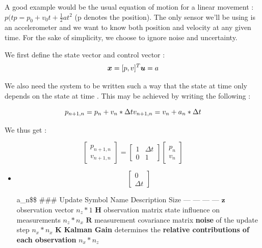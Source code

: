 \documentclass[12pt]{article}
\begin{document}
A good example would be the usual equation of motion for a linear
movement : \(p(tp = p_0 + v_0t + \frac{1}{2}at^2\) (p denotes the
position). The only sensor we'll be using is an accelerometer and we
want to know both position and velocity at any given time. For the sake
of simplicity, we choose to ignore noise and uncertainty.

We first define the state vector and control vector :
\[\boldsymbol x = [p, v]^T
\\
\boldsymbol u = a\]

We also need the system to be written such a way that the state at time
only depends on the state at time . This may be achieved by writing the
following :

\[p_{n+1,n} = p_{n} + v_{n}*\Delta t
\\
v_{n+1,n} = v_{n} + a_{n}*\Delta t\]

We thus get :

\begin{equation}
\begin{bmatrix}
p_{n+1,n}\\
v_{n+1,n}
\end{bmatrix} =
\begin{bmatrix}
1 & \Delta t\\
0 & 1
\end{bmatrix}
\begin{bmatrix}
p_n\\
v_n
\end{bmatrix}
\end{equation}

\begin{itemize}
\item
  $$\begin{bmatrix}
  0\\
  \Delta t
  \end{bmatrix}$$

  a\_n\$\$ \#\#\# Update \textbar{} Symbol \textbar{} Name \textbar{}
  Description \textbar{} Size \textbar{} \textbar{} --- \textbar{} ---
  \textbar{} --- \textbar{} --- \textbar{} \textbar{} \(\boldsymbol z\)
  \textbar{} observation vector \textbar{} \textbar{} \(n_z*1\)
  \textbar{} \textbar{} \(\boldsymbol H\)\textbar{} observation matrix
  \textbar{} state influence on measurements \textbar{}
  \(n_z*n_x\)\textbar{} \textbar{} \(\boldsymbol R\)\textbar{}
  measurement covariance matrix \textbar{} \textbf{noise} of the update
  step \textbar{}\(n_x*n_x\)\textbar{} \textbar{}
  \(\boldsymbol K\)\textbar{} \textbf{Kalman Gain}\textbar{} determines
  the \textbf{relative contributions of each observation}
  \textbar{}\(n_x*n_z\)\textbar{}
\end{itemize}
\end{document}
